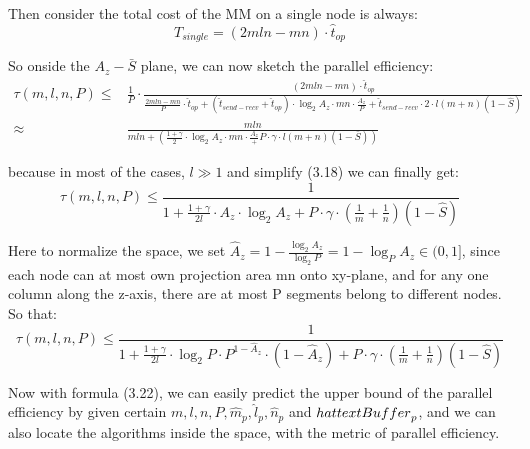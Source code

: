 \documentclass{amsart}
\theoremstyle{definition}
\theoremstyle{remark}
\numberwithin{equation}{section}
\begin{document}
	Then consider the total cost of the MM on a single node is always:
\begin{equation}
T_{single}=(2mln-mn)\cdot\hat{t}_{op}
\end{equation}
\par
So onside the $A_z-\bar{S}$ plane, we can now sketch the parallel efficiency:
\begin{equation}
\renewcommand\arraystretch{1.75}
\begin{array}{rl}
\tau(m,l,n,P)\le&\frac{1}{P}\cdot\frac{(2mln-mn)\cdot\hat{t}_{op}}
				 {\frac{2mln-mn}{P}\cdot\hat{t}_{op}+(\hat{t}_{send-recv}+
				  \hat{t}_{op})\cdot \log_{2}A_z\cdot mn\cdot\frac{A_z}{P}+
				  \hat{t}_{send-recv}\cdot 2\cdot l(m+n)(1-\hat{S})}\\
\approx&\frac{mln}{mln+(\frac{1+\gamma}{2}\cdot \log_{2}A_z\cdot mn\cdot\frac{A_z}+
				   P\cdot \gamma\cdot l(m+n)(1-\bar{S}))}
\end{array}
\end{equation}

because in most of the cases, $l\gg 1$ and simplify (3.18) we can finally get:
\begin{equation}
\tau(m,l,n,P)\le\frac{1}{1+\frac{1+\gamma}{2l}\cdot A_z\cdot \log_{2}A_z+P\cdot \gamma\cdot(\frac{1}{m}+\frac{1}{n})(1-\hat{S})}
\end{equation}

\par
Here to normalize the space, we set $\hat{A}_z=1-\frac{\log_{2}A_z}{\log_{2}P}=1-\log_{P}A_z\in(0,1]$, since each node can at most own projection area mn onto xy-plane, and for any one column along the z-axis, there are at most P segments belong to different nodes. So that:
\begin{equation}
\tau(m,l,n,P)\le\frac{1}{1+\frac{1+\gamma}{2l}\cdot \log_{2}P\cdot P^{1-\hat{A}_z}\cdot(1-\hat{A}_z)
			+ P\cdot \gamma\cdot(\frac{1}{m}+\frac{1}{n})(1-\hat{S})}
\end{equation}
\par
Now with formula (3.22), we can easily predict the upper bound of the parallel efficiency by given certain $m,l,n,P,\hat{m}_p,\hat{l}_p,\hat{n}_p$ and $\\hat{text{Buffer}}_p$, and we can also locate the algorithms inside the space, with the metric of parallel efficiency.\par

\end{document}
